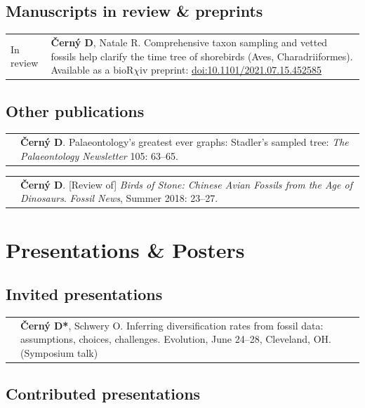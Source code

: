 \documentclass[10pt]{article}
\begin{document}
\subsection*{Manuscripts in review \& preprints}

\begin{tabularx}{\textwidth}{>{\raggedleft\arraybackslash}p{2.2cm} X}
In review & \textbf{\v{C}ern\'{y} D}, Natale R. Comprehensive taxon sampling and vetted fossils help clarify the time tree of shorebirds (Aves, Charadriiformes). Available as a bioR$\chi$iv preprint: \href{http://www.biorxiv.org/content/10.1101/2021.07.15.452585v1}{doi:10.1101/2021.07.15.452585}
\end{tabularx}

\subsection*{Other publications}

\begin{tabularx}{\textwidth}{>{\raggedleft\arraybackslash}p{2.2cm} X}
2020 & \textbf{\v{C}ern\'{y} D}. Palaeontology's greatest ever graphs:
Stadler's sampled tree: \textit{The Palaeontology Newsletter} 105: 63--65.
\end{tabularx}
\begin{tabularx}{\textwidth}{>{\raggedleft\arraybackslash}p{2.2cm} X}
2018 & \textbf{\v{C}ern\'{y} D}. [Review of] \textit{Birds of Stone: Chinese Avian Fossils from the Age of Dinosaurs}. \textit{Fossil News}, Summer 2018: 23--27.
\end{tabularx}

\section*{Presentations \& Posters}

\subsection*{Invited presentations}

\begin{tabularx}{\textwidth}{>{\raggedleft\arraybackslash}p{2.2cm} X}
2022 & \textbf{\v{C}ern\'{y} D*}, Schwery O. Inferring diversification rates from fossil data: assumptions, choices, challenges. Evolution, June 24--28, Cleveland, OH. (Symposium talk)
\end{tabularx}

\subsection*{Contributed presentations}
\end{document}
